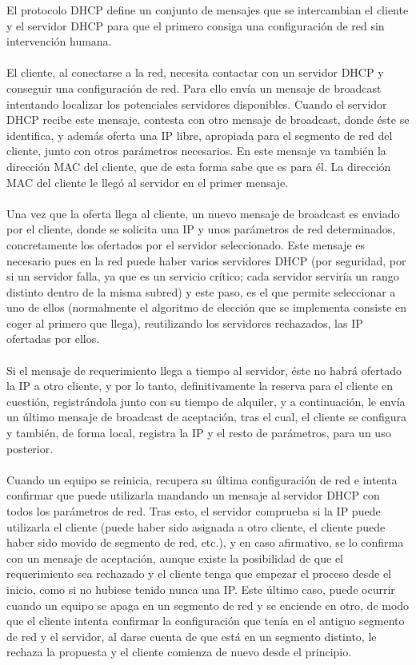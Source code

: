 		El protocolo DHCP define un conjunto de mensajes que se intercambian el cliente y el servidor DHCP para que el primero consiga una configuración de red sin intervención humana.\\\\
		El cliente, al conectarse a la red, necesita contactar con un servidor DHCP y conseguir una configuración de red. Para ello envía un mensaje de broadcast intentando localizar los potenciales servidores disponibles. Cuando el servidor DHCP recibe este mensaje, contesta con otro mensaje de broadcast, donde éste se identifica, y además oferta una IP libre, apropiada para el segmento de red del cliente, junto con otros parámetros necesarios. En este mensaje va también la dirección MAC del cliente, que de esta forma sabe que es para él. La dirección MAC del cliente le llegó al servidor en el primer mensaje.\\\\
		Una vez que la oferta llega al cliente, un nuevo mensaje de broadcast es enviado por el cliente, donde se solicita una IP y unos parámetros de red determinados, concretamente los ofertados por el servidor seleccionado. Este mensaje es necesario pues en la red puede haber varios servidores DHCP (por seguridad, por si un servidor falla, ya que es un servicio crítico; cada servidor serviría un rango distinto dentro de la misma subred) y este paso, es el que permite seleccionar a uno de ellos (normalmente el algoritmo de elección que se implementa consiste en coger al primero que llega), reutilizando los servidores rechazados, las IP ofertadas por ellos.\\\\
		Si el mensaje de requerimiento llega a tiempo al servidor, éste no habrá ofertado la IP a otro cliente, y por lo tanto, definitivamente la reserva para el cliente en cuestión, registrándola junto con su tiempo de alquiler, y a continuación, le envía un último mensaje de broadcast de aceptación, tras el cual, el cliente se configura y también, de forma local, registra la IP y el resto de parámetros, para un uso posterior.\\\\
		Cuando un equipo se reinicia, recupera su última configuración de red e intenta confirmar que puede utilizarla mandando un mensaje al servidor DHCP con todos los parámetros de red. Tras esto, el servidor comprueba si la IP puede utilizarla el cliente (puede haber sido asignada a otro cliente, el cliente puede haber sido movido de segmento de red, etc.), y en caso afirmativo, se lo confirma con un mensaje de aceptación, aunque existe la posibilidad de que el requerimiento sea rechazado y el cliente tenga que empezar el proceso desde el inicio, como si no hubiese tenido nunca una IP. Este último caso, puede ocurrir cuando un equipo se apaga en un segmento de red y se enciende en otro, de modo que el cliente intenta confirmar la configuración que tenía en el antiguo segmento de red y el servidor, al darse cuenta de que está en un segmento distinto, le rechaza la propuesta y el cliente comienza de nuevo desde el principio.\\\\
